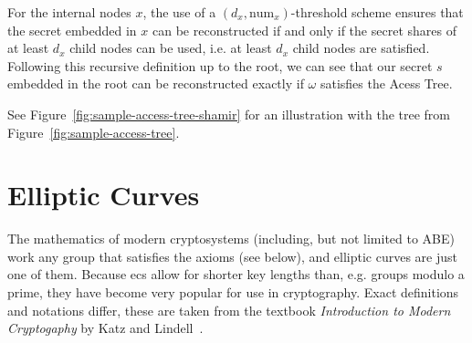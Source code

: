 For the internal nodes $x$, the use of a $(d_x, \text{num}_x)$-threshold scheme ensures that the secret embedded in $x$ can be reconstructed if and only if the secret shares of at least $d_x$ child nodes can be used, i.e. at least $d_x$ child nodes are satisfied.
Following this recursive definition up to the root, we can see that our secret $s$ embedded in the root can be reconstructed exactly if $\omega$ satisfies the Acess Tree.

See Figure~\ref{fig:sample-access-tree-shamir} for an illustration with the tree from Figure~\ref{fig:sample-access-tree}.


\section{Elliptic Curves}
\label{sec:ec}

The mathematics of modern cryptosystems (including, but not limited to ABE) work any group that satisfies the axioms (see below), and elliptic curves are just one of them.
Because \Glspl{ec} allow for shorter key lengths than, e.g. groups modulo a prime, they have become very popular for use in cryptography.
Exact definitions and notations differ, these are taken from the textbook \emph{Introduction to Modern Cryptogaphy} by Katz and Lindell~\cite{katz_introduction_2015}.

